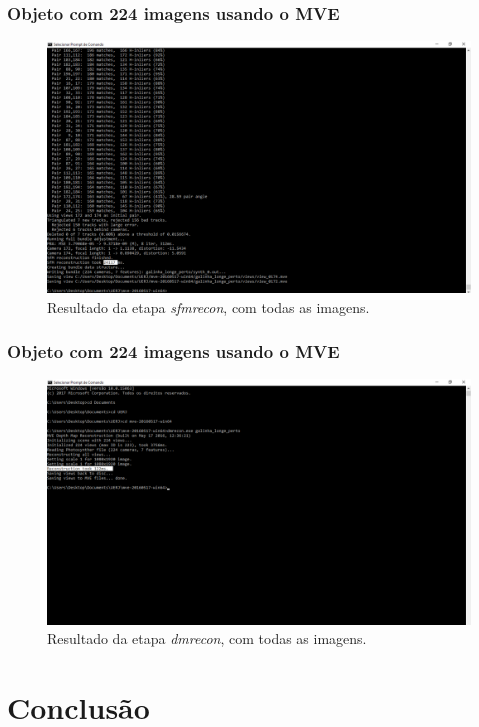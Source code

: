 \documentclass[table, usenames, svgnames, xcolor=dvipsnames]{beamer}
\begin{document}
\begin{frame}
\frametitle{\textbf{Objeto com 224 imagens usando o MVE}}
	\begin{figure}[!h]
		\centering
		\includegraphics[width=0.8\linewidth]{figs/mvesfmrecongalinhapertolonge.png}
		\caption{%
		Resultado da etapa \emph{sfmrecon}, com todas as imagens.
		}\label{fig:galinhaSfM224}
	\end{figure}
\end{frame}

\begin{frame}
\frametitle{\textbf{Objeto com 224 imagens usando o MVE}}
	\begin{figure}[!h]
			\centering
			\includegraphics[width=0.8\linewidth]{figs/mvedmrecongalinhapertolonge.png}
			\caption{%
			Resultado da etapa \emph{dmrecon}, com todas as imagens.
			}\label{fig:galinhaDMR224}
	\end{figure}
\end{frame}

\section{Conclusão}
\end{document}
